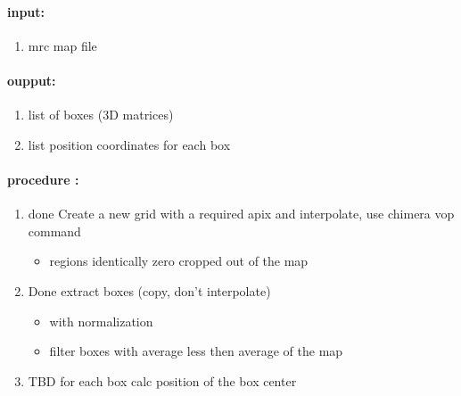 \paragraph{input:} 
\begin{enumerate}
\item mrc map file
\end{enumerate}
\paragraph{oupput:} 
\begin{enumerate}
\item list of boxes (3D matrices)
\item list position coordinates for each box
\end{enumerate}
\paragraph{procedure :}
\begin{enumerate}
\item {\color{blue} done} Create a new grid with a required apix and interpolate, use chimera vop command 
	\begin{itemize}
		\item regions identically zero cropped out of the map
	\end{itemize}
\item {\color{blue} Done} extract boxes (copy, don't interpolate)
	\begin{itemize}
		\item with normalization
		\item filter boxes with average less then average of the map
	\end{itemize}
\item {\color{red} TBD} for each box calc position of the box center
\end{enumerate}